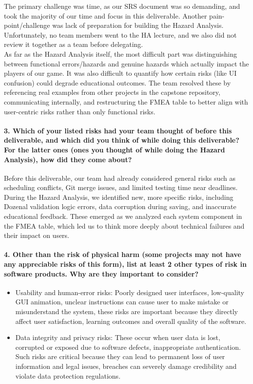 \documentclass{article}
\begin{document}
The primary challenge was time, as our SRS document was so demanding, 
and took the majority of our time and focus in this deliverable.
Another pain-point/challenge was lack of preparation for building the Hazard Analysis.
Unfortunately, no team members went to the HA lecture, and we also did not review 
it together as a team before delegating.\\
As far as the Hazard Analysis itself, the most difficult part was
distinguishing between functional errors/hazards and genuine 
hazards which actually impact the players of our game. It was also difficult to quantify how 
certain risks (like UI confusion) could degrade educational outcomes. The team 
resolved these by referencing real examples from other projects in the capstone 
repository, communicating internally, and restructuring the FMEA table 
to better align with user-centric risks rather than only functional risks.

\paragraph{3. Which of your listed risks had your team thought of before this deliverable, and which did you think of while doing this deliverable? For the latter ones (ones you thought of while doing the Hazard Analysis), how did they come about?}
    
    Before this deliverable, our team had already considered general risks such as scheduling conflicts, Git merge issues, and limited testing time near deadlines.
    During the Hazard Analysis, we identified new, more specific risks, including Dozenal validation logic errors, data corruption during saving, and inaccurate educational feedback. These emerged as we analyzed each system component in the FMEA table, which led us to think more deeply about technical failures and their impact on users.

\paragraph{4. Other than the risk of physical harm (some projects may not have any appreciable risks of this form), list at least 2 other types of risk in software products. Why are they important to consider?}
\begin{itemize}
	\item Usability and human-error risks: Poorly designed user interfaces, low-quality GUI animation, unclear instructions can cause user to make mistake or misunderstand the system, these risks are important because they directly affect user satisfaction, learning outcomes and overall quality of the software.
	\item Data integrity and privacy risks: These occur when user data is lost, corrupted or exposed due to software defects, inappropriate authentication. Such risks are critical because they can lead to permanent loss of user information and legal issues, breaches can severely damage credibility and violate data protection regulations.	
\end{itemize}
\end{document}
